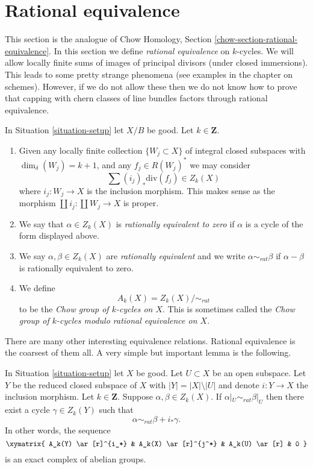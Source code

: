 \section{Rational equivalence}
\label{section-rational-equivalence}

\noindent
This section is the analogue of
Chow Homology, Section \ref{chow-section-rational-equivalence}.
In this section we define {\it rational equivalence} on $k$-cycles.
We will allow locally finite sums of images of
principal divisors (under closed immersions). This leads to some
pretty strange phenomena (see examples in the chapter on schemes).
However, if we do not allow these then we do not know how to prove that
capping with chern classes of line bundles factors through rational
equivalence.

\begin{definition}
\label{definition-rational-equivalence}
In Situation \ref{situation-setup} let $X/B$ be good.
Let $k \in \mathbf{Z}$.
\begin{enumerate}
\item Given any locally finite collection $\{W_j \subset X\}$
of integral closed subspaces with $\dim_\delta(W_j) = k + 1$,
and any $f_j \in R(W_j)^*$ we may consider
$$
\sum (i_j)_*\text{div}(f_j) \in Z_k(X)
$$
where $i_j : W_j \to X$ is the inclusion morphism.
This makes sense as the morphism
$\coprod i_j : \coprod W_j \to X$ is proper.
\item We say that $\alpha \in Z_k(X)$ is {\it rationally equivalent to zero}
if $\alpha$ is a cycle of the form displayed above.
\item We say $\alpha, \beta \in Z_k(X)$ are
{\it rationally equivalent} and we write $\alpha \sim_{rat} \beta$
if $\alpha - \beta$ is rationally equivalent to zero.
\item We define
$$
A_k(X) = Z_k(X) / \sim_{rat}
$$
to be the {\it Chow group of $k$-cycles on $X$}. This is sometimes called
the {\it Chow group of $k$-cycles modulo rational equivalence on $X$}.
\end{enumerate}
\end{definition}

\noindent
There are many other interesting equivalence relations.
Rational equivalence is the coarsest of them all.
A very simple but important lemma is the following.

\begin{lemma}
\label{lemma-restrict-to-open}
In Situation \ref{situation-setup} let $X$ be good.
Let $U \subset X$ be an open subspace. Let $Y$ be the
reduced closed subspace of $X$ with $|Y| = |X| \setminus |U|$
and denote $i : Y \to X$ the inclusion morphism. Let $k \in \mathbf{Z}$.
Suppose $\alpha, \beta \in Z_k(X)$. If $\alpha|_U \sim_{rat} \beta|_U$
then there exist a cycle $\gamma \in Z_k(Y)$ such that
$$
\alpha \sim_{rat} \beta + i_*\gamma.
$$
In other words, the sequence
$$
\xymatrix{
A_k(Y) \ar[r]^{i_*} & A_k(X) \ar[r]^{j^*} & A_k(U) \ar[r] & 0
}
$$
is an exact complex of abelian groups.
\end{lemma}

